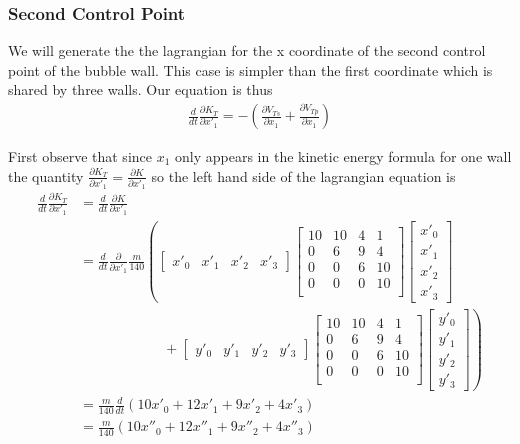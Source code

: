 \documentclass{article}
\begin{document}
\subsubsection{Second Control Point}
We will generate the the lagrangian for the x coordinate of the second control
point of the bubble wall. This case is simpler than the first coordinate which
is shared by three walls. Our equation is thus
\begin{align*}
 \frac{d}{d t} \frac{\partial K_T}{\partial x'_1} =-\left(\frac{\partial
 V_{Ts}}{\partial x_1} + \frac{\partial V_{Tp}}{\partial x_1}\right)
\end{align*}

First observe that since $x_1$ only appears in the kinetic energy formula for
one wall the quantity $\frac{\partial K_T}{\partial x'_1}=\frac{\partial K}{\partial x'_1}$
 so the left hand side of the lagrangian equation is 
\begin{align*}
\frac{d}{d t} \frac{\partial K_T}{\partial x'_1} &=
\frac{d}{d t} \frac{\partial K}{\partial x'_1}\\
 &= \frac{d}{d t}
 \frac{\partial }{\partial x'_1} \frac{m}{140} \left(
\begin{bmatrix} x'_0 & x'_1 & x'_2 & x'_3 \end{bmatrix}
 \begin{bmatrix} 
10 & 10 & 4 & 1\\
0 & 6 & 9 & 4\\
0 & 0 & 6 & 10\\
0 & 0 & 0 & 10\\ 
\end{bmatrix}
\begin{bmatrix} x'_0\\x'_1\\x'_2\\x'_3 \end{bmatrix}
\right.\\
&\qquad\qquad\qquad+ \left.
\begin{bmatrix} y'_0 & y'_1 & y'_2 & y'_3 \end{bmatrix}
 \begin{bmatrix} 
10 & 10 & 4 & 1\\
0 & 6 & 9 & 4\\
0 & 0 & 6 & 10\\
0 & 0 & 0 & 10\\ 
\end{bmatrix}
\begin{bmatrix} y'_0\\y'_1\\y'_2\\y'_3 \end{bmatrix} 
\right)\\ 
&= \frac{m}{140} \frac{d}{d t}\left(10x'_0+12x'_1+9x'_2+4x'_3 \right)\\
&= \frac{m}{140} \left(10x''_0+12x''_1+9x''_2+4x''_3 \right)
\end{align*}
\end{document}
